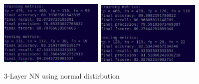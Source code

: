 \documentclass[a4paper,10pt,twocolumn]{article}
\begin{document}
\begin{figure}[h!]
\centering
\includegraphics[scale=1.0, width=5cm]{Fig7.png}
\includegraphics[scale=1.0, width=5cm]{Fig8.png}
\caption*{3-Layer NN using normal distirbution}
\end{figure}
\end{document}
